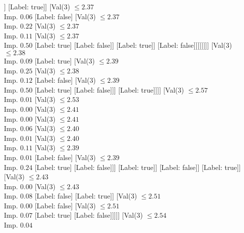 \documentclass[margin=10pt]{standalone}
\begin{document}
\begin{forest}
																]
															[Label: true]]
														[Val($3$) $ \leq 2.37$ \\ Imp. $0.06$
															[Label: false]
															[Val($3$) $ \leq 2.37$ \\ Imp. $0.22$
																[Val($3$) $ \leq 2.37$ \\ Imp. $0.11$
																	[Val($3$) $ \leq 2.37$ \\ Imp. $0.50$
																		[Label: true]
																		[Label: false]]
																	[Label: true]]
																[Label: false]]]]]]]]
									[Val($3$) $ \leq 2.38$ \\ Imp. $0.09$
										[Label: true]
										[Val($3$) $ \leq 2.39$ \\ Imp. $0.25$
											[Val($3$) $ \leq 2.38$ \\ Imp. $0.12$
												[Label: false]
												[Val($3$) $ \leq 2.39$ \\ Imp. $0.50$
													[Label: true]
													[Label: false]]]
											[Label: true]]]]
								[Val($3$) $ \leq 2.57$ \\ Imp. $0.01$
									[Val($3$) $ \leq 2.53$ \\ Imp. $0.00$
										[Val($3$) $ \leq 2.41$ \\ Imp. $0.00$
											[Val($3$) $ \leq 2.41$ \\ Imp. $0.06$
												[Val($3$) $ \leq 2.40$ \\ Imp. $0.01$
													[Val($3$) $ \leq 2.40$ \\ Imp. $0.11$
														[Val($3$) $ \leq 2.39$ \\ Imp. $0.01$
															[Label: false]
															[Val($3$) $ \leq 2.39$ \\ Imp. $0.24$
																[Label: true]
																[Label: false]]]
														[Label: true]]
													[Label: false]]
												[Label: true]]
											[Val($3$) $ \leq 2.43$ \\ Imp. $0.00$
												[Val($3$) $ \leq 2.43$ \\ Imp. $0.08$
													[Label: false]
													[Label: true]]
												[Val($3$) $ \leq 2.51$ \\ Imp. $0.00$
													[Label: false]
													[Val($3$) $ \leq 2.51$ \\ Imp. $0.07$
														[Label: true]
														[Label: false]]]]]
										[Val($3$) $ \leq 2.54$ \\ Imp. $0.04$

\end{forest}
\end{document}
